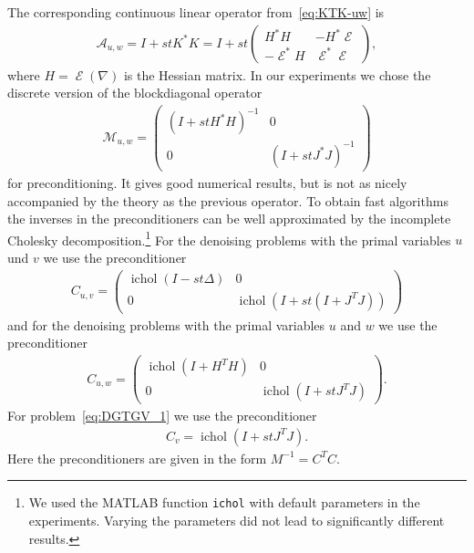 \documentclass[twocolumn,envcountsame]{svjour3}
\newcommand{\MA}{\mathcal{A}}
\DeclareMathOperator{\symgrad}{\mathcal{E}}
\begin{document}
The corresponding continuous linear operator from~\eqref{eq:KTK-uw} is
  \begin{align*}
    \MA_{u,w}= I+stK^*K=I+st\begin{pmatrix}H^*H & -H^*\symgrad\\-\symgrad^*H & \symgrad^*\symgrad\end{pmatrix},
  \end{align*}
  where $H=\symgrad(\nabla)$ is the Hessian matrix.
  In our experiments we chose the discrete version of the
  blockdiagonal operator
\begin{align*}
  \mathcal{M}_{u,w}=\begin{pmatrix} (I+stH^*H)^{-1} & 0\\ 0 &
    \left(I+ st J^*J\right)^{-1}\end{pmatrix}
\end{align*}
for preconditioning. It gives good numerical results, but is not as nicely accompanied by the theory
as the previous operator.
To obtain fast algorithms the inverses in the preconditioners can be well approximated by the incomplete
Cholesky decomposition.\footnote{We used the MATLAB function \texttt{ichol} with default parameters in the experiments. Varying the parameters did not lead to significantly different results.} 
For the denoising problems with the primal variables $u$ und $v$ we use the preconditioner
\begin{align}
  \label{preconditioner_uv}
  C_{u,v}=\begin{pmatrix} \operatorname{ichol}(I-st\Delta) & 0\\ 0 &
    \operatorname{ichol}\left(I+ st\left(I
    +J^TJ\right)\right)\end{pmatrix}
\end{align}
and for the denoising problems with the primal variables $u$ and $w$ we use the preconditioner
\begin{align}
  \label{preconditioner_uw}
  C_{u,w}=\begin{pmatrix} \operatorname{ichol}(I + H^TH) & 0\\ 0 &
    \operatorname{ichol}\left(I+ stJ^TJ\right)\end{pmatrix}.
\end{align}
For problem~\eqref{eq:DGTGV_1} we use the preconditioner
\begin{align}
  \label{preconditioner_v}
  C_{v}= \operatorname{ichol}(I + stJ^TJ).
\end{align}
Here the preconditioners are given in the form $M^{-1}=C^TC$.
\end{document}
